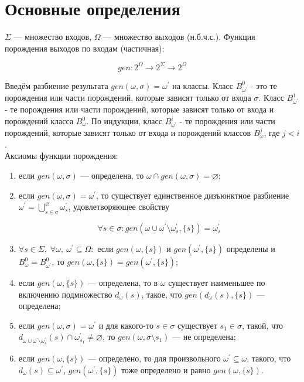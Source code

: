\section{Основные определения}

$\Sigma$ --- множество входов, $\Omega$ --- множество выходов (н.б.ч.с.). Функция порождения
выходов по входам (частичная):

$$
gen : 2^\Omega\to 2^\Sigma\to 2^\Omega
$$

Введём разбиение результата $gen(\omega, \sigma) = \omega^\prime$ на классы. Класс $B^0_{\omega^\prime}$ - это те порождения или части порождений, которые зависят только от входа $\sigma$. Класс $B^1_{\omega^\prime}$ - те порождения или части порождений, которые зависят только от входа и порождений класса $B^0_{\omega}$. По индукции, класс $B^i_{\omega^\prime}$ - те порождения или части порождений, которые зависят только от входа и порождений классов $B^j_{\omega}$, где $j < i$.\\

Аксиомы функции порождения:

\begin{enumerate}
	\item если $gen(\omega,\sigma)$ --- определена, то $\omega\cap gen(\omega,\sigma)=\varnothing$;
	
	\item если $gen(\omega,\sigma)=\omega^\prime$, то существует единственное дизъюнктное разбиение $\omega^\prime=\bigcup^\varnothing_{s\in\sigma}\omega^\prime_s$, 
	удовлетворяющее свойству 

	$$\forall s\in\sigma : gen(\omega\cup\omega^\prime\setminus\omega^\prime_s,\{s\})=\omega^\prime_s$$

	\item $\forall s\in\Sigma,\; \forall\omega,\:\omega^\prime\subseteq\Omega:$ если $gen(\omega,\{s\})$ и $gen(\omega^\prime,\{s\})$ определены и $B^0_{\omega} = B^0_{\omega^\prime}$, то $gen(\omega,\{s\}) = gen(\omega^\prime,\{s\})$;

	\item если $gen(\omega,\{s\})$ --- определена, то в $\omega$ существует наименьшее по включению подмножество $d_\omega(s)$, такое, что
	$gen(d_\omega(s), \{s\})$ --- определена;

	\item если $gen(\omega,\sigma)=\omega^\prime$ и для какого-то $s\in\sigma$ существует $s_1\in\sigma$, такой, что
	$d_{\omega\cup\omega^\prime\setminus\omega^\prime_s}(s) \cap \omega^\prime_{s_1}\ne\varnothing$, 
	то $gen(\omega,\sigma\setminus s_1)$ --- не определена;
	
	\item если $gen(\omega,\{s\})$ --- определено, то для произвольного $\omega^\prime\subseteq\omega$, такого, что $d_\omega(s)\subseteq\omega^\prime$, $gen(\omega^\prime, \{s\})$ тоже определено и равно $gen(\omega,\{s\})$.
\end{enumerate}